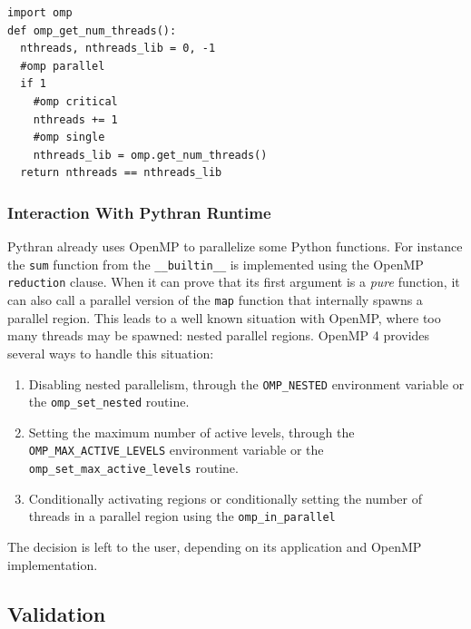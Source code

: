 \documentclass[conference]{IEEEtran}
\begin{document}
\begin{lstlisting}[float,label={lst:sample-api-usage},caption={Example of
        OpenMP API usage from Python.}]
import omp
def omp_get_num_threads():
  nthreads, nthreads_lib = 0, -1
  #omp parallel
  if 1
    #omp critical
    nthreads += 1
    #omp single
    nthreads_lib = omp.get_num_threads()
  return nthreads == nthreads_lib
\end{lstlisting}

\subsubsection{Interaction With Pythran Runtime}

Pythran already uses OpenMP to parallelize some Python functions. For instance
the \texttt{sum} function from the \texttt{\_\_builtin\_\_} is implemented using
the OpenMP \texttt{reduction} clause. When it can prove that its first argument
is a \emph{pure} function, it can also call a parallel version of the
\texttt{map} function that internally spawns a parallel region. This leads to a
well known situation with OpenMP, where too many threads may be spawned: nested
parallel regions. OpenMP 4 provides several ways to handle this situation:

\begin{enumerate}

    \item Disabling nested parallelism, through the \texttt{OMP\_NESTED}
        environment variable or the \texttt{omp\_set\_nested} routine.

    \item Setting the maximum number of active levels, through the
        \texttt{OMP\_MAX\_ACTIVE\_LEVELS} environment variable or the
        \texttt{omp\_set\_max\_active\_levels} routine.
            

    \item Conditionally activating regions or conditionally setting the number
        of threads in a parallel region using the \texttt{omp\_in\_parallel}

\end{enumerate}

The decision is left to the user, depending on its application and OpenMP
implementation.

\subsection{Validation}
\end{document}
